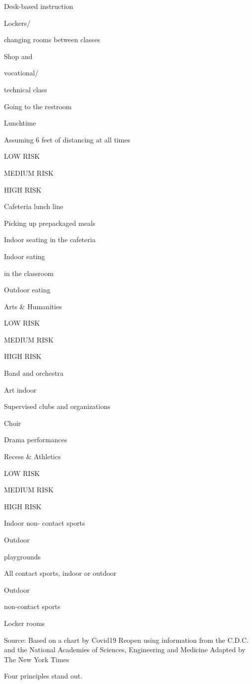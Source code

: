 Desk-based instruction

Lockers/

changing rooms between classes

Shop and

vocational/

technical class

Going to the restroom

Lunchtime

Assuming 6 feet of distancing at all times

LOW RISK

MEDIUM RISK

HIGH RISK

Cafeteria lunch line

Picking up prepackaged meals

Indoor seating in the cafeteria

Indoor eating

in the classroom

Outdoor eating

Arts \& Humanities

LOW RISK

MEDIUM RISK

HIGH RISK

Band and orchestra

Art indoor

Supervised clubs and organizations

Choir

Drama performances

Recess \& Athletics

LOW RISK

MEDIUM RISK

HIGH RISK

Indoor non- contact sports

Outdoor

playgrounds

All contact sports, indoor or outdoor

Outdoor

non-contact sports

Locker rooms

Source: Based on a chart by Covid19 Reopen using information from the
C.D.C. and the National Academies of Sciences, Engineering and Medicine
\textbar{} Adapted by The New York Times

Four principles stand out.

